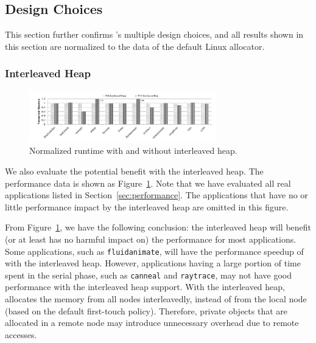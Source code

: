 \subsection{Design Choices}
\label{sec:design}

This section further confirms \NM{}'s multiple design choices, and all results shown in this section are normalized to the data of the default Linux allocator.  




\subsubsection{Interleaved Heap} 
\label{sec:interleavedheap}

\begin{figure}[!h]
    \centering
    \includegraphics[width=3.2in]{figure/interleavedheap-new.pdf}
    \caption{Normalized runtime with and without  interleaved heap.\label{fig:interleavedheap}}  
\end{figure}

We also evaluate the potential benefit with the  interleaved heap. The performance data is shown as Figure~\ref{fig:interleavedheap}. Note that we have evaluated all real applications listed in Section~\ref{sec:performance}. The applications that have no or little performance impact by the interleaved heap are omitted in this figure. 

From Figure~\ref{fig:interleavedheap}, we have the following conclusion: the interleaved heap will benefit (or at least has no harmful impact on) the performance for most applications. Some applications, such as \texttt{fluidanimate}, will have the performance speedup of \toconfirm{$3.06\times$} with the interleaved heap. However, applications having a large portion of time spent in the serial phase, such as \texttt{canneal} and \texttt{raytrace}, may not have good performance with the interleaved heap support. With the interleaved heap, \NM{} allocates the memory from all nodes interleavedly, instead of from the local node (based on the default first-touch policy). Therefore, private objects that are allocated in a remote node may introduce unnecessary overhead due to remote accesses.
 
